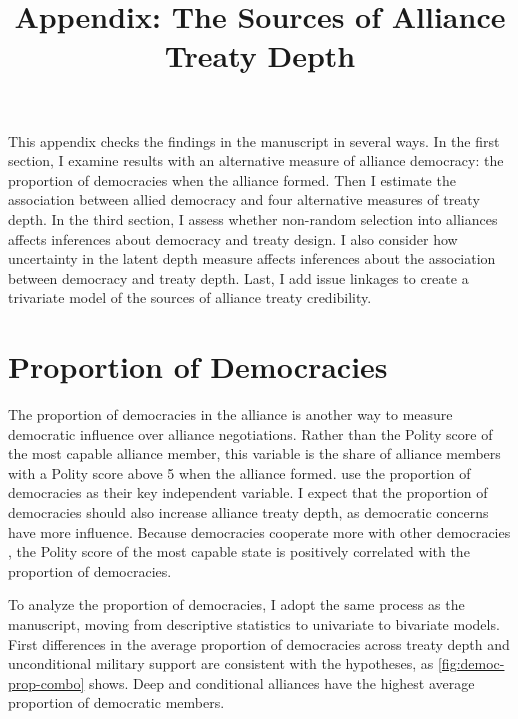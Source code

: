 \documentclass[12pt]{article}
\title{\textbf{Appendix: The Sources of Alliance Treaty Depth}}
\author{}
\date{}
\begin{document}
\maketitle 

\doublespace 

This appendix checks the findings in the manuscript in several ways. 
In the first section, I examine results with an alternative measure of alliance democracy: the proportion of democracies when the alliance formed. 
Then I estimate the association between allied democracy and four alternative measures of treaty depth.
In the third section, I assess whether non-random selection into alliances affects inferences about democracy and treaty design.   
I also consider how uncertainty in the latent depth measure affects inferences about the association between democracy and treaty depth. 
Last, I add issue linkages to create a trivariate model of the sources of alliance treaty credibility. 


\section{Proportion of Democracies}


The proportion of democracies in the alliance is another way to measure democratic influence over alliance negotiations.  
Rather than the Polity score of the most capable alliance member, this variable is the share of alliance members with a Polity score above 5 when the alliance formed. 
\citet{Chibaetal2015} use the proportion of democracies as their key independent variable. 
I expect that the proportion of democracies should also increase alliance treaty depth, as democratic concerns have more influence.
Because democracies cooperate more with other democracies \citep{Leeds1999}, the Polity score of the most capable state is positively correlated with the proportion of democracies. 


To analyze the proportion of democracies, I adopt the same process as the manuscript, moving from descriptive statistics to univariate to bivariate models. 
First differences in the average proportion of democracies across treaty depth and unconditional military support are consistent with the hypotheses, as \autoref{fig:democ-prop-combo} shows.
Deep and conditional alliances have the highest average proportion of democratic members.
\end{document}
